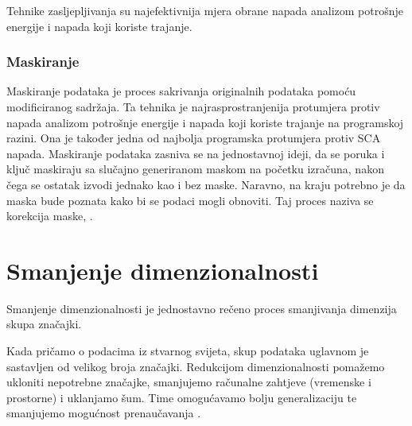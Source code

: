 \documentclass[times, utf8, diplomski]{fer}
\begin{document}
Tehnike zasljepljivanja su najefektivnija mjera obrane napada analizom potrošnje energije i napada koji koriste trajanje.

\subsection{Maskiranje}

Maskiranje podataka je proces sakrivanja originalnih podataka pomoću modificiranog sadržaja. Ta tehnika je najrasprostranjenija protumjera protiv  napada analizom potrošnje energije i napada koji koriste trajanje na programskoj razini. Ona je također jedna od najbolja programska protumjera protiv SCA napada. Maskiranje podataka zasniva se na jednostavnoj ideji, da se poruka i ključ maskiraju sa slučajno generiranom maskom na početku izračuna, nakon čega se ostatak izvodi jednako kao i bez maske. Naravno, na kraju potrebno je da maska bude poznata kako bi se podaci mogli obnoviti. Taj proces naziva se korekcija maske, .

\chapter{Smanjenje dimenzionalnosti}

Smanjenje dimenzionalnosti  je jednostavno rečeno proces smanjivanja dimenzija skupa značajki.

Kada pričamo o podacima iz stvarnog svijeta, skup podataka uglavnom je sastavljen od velikog broja značajki. Redukcijom dimenzionalnosti pomažemo ukloniti nepotrebne značajke, smanjujemo računalne zahtjeve (vremenske i prostorne) i uklanjamo šum. Time omogućavamo bolju generalizaciju te smanjujemo mogućnost prenaučavanja .
\end{document}

